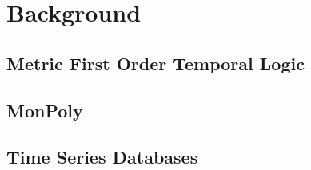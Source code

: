 \section{Background}

\subsection{Metric First Order Temporal Logic}

\subsection{MonPoly}

\subsection{Time Series Databases}
